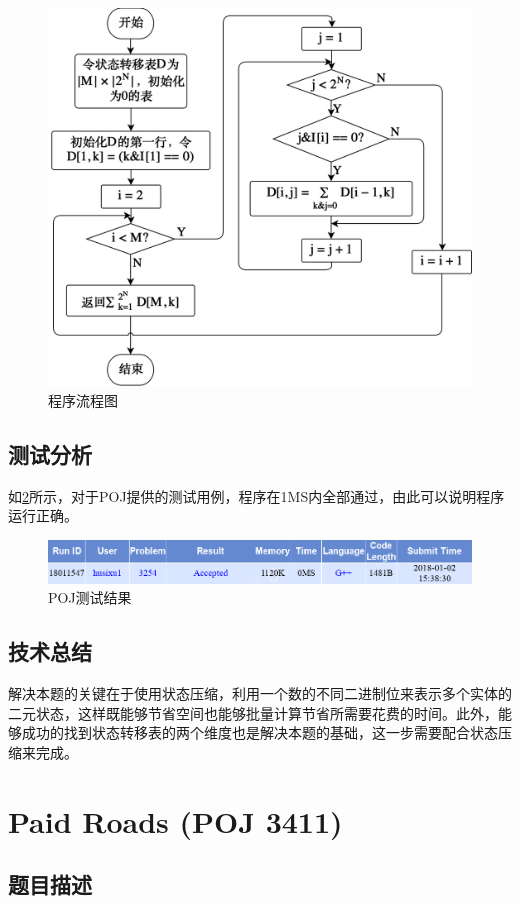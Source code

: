 \documentclass{report}
\begin{document}
\begin{figure}[ht]
    \centering
    \includegraphics[width=0.6\linewidth]{flowchart7.png}
    \caption{程序流程图}
    \label{fig:flowchart7}
\end{figure}

\section{测试分析}
\label{sec:ce_shi_fen_xi_7}
如\ref{fig:result7}所示，对于POJ提供的测试用例，程序在1MS内全部通过，由此可以说明程序运行正确。

\begin{figure}[ht]
    \centering
    \includegraphics[width=0.9\linewidth]{result7.png}
    \caption{POJ测试结果}
    \label{fig:result7}
\end{figure}

\section{技术总结}
\label{sec:ji_zhu_zong_jie_7}
解决本题的关键在于使用状态压缩，利用一个数的不同二进制位来表示多个实体的二元状态，这样既能够节省空间也能够批量计算节省所需要花费的时间。此外，能够成功的找到状态转移表的两个维度也是解决本题的基础，这一步需要配合状态压缩来完成。

\chapter{Paid Roads (POJ 3411)}
\label{cha:paid_roads_poj_3411_}

\section{题目描述}
\label{sec:ti_mu_miao_shu_8}
\end{document}

